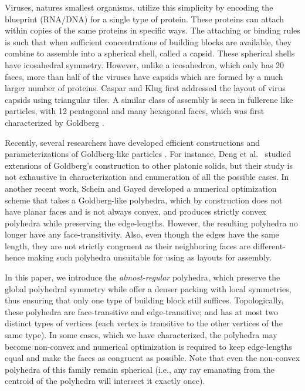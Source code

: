 \documentclass[11pt]{article}
\newcommand{\1}{\mathds{1}}
\begin{document}
Viruses, natures smallest organisms, utilize this simplicity by encoding the blueprint (RNA/DNA) for a single type of protein. These proteins can attach within copies of the same proteins in specific ways. The attaching or binding rules is such that when sufficient concentrations of building blocks are available, they combine to assemble into a spherical shell, called a capsid. These spherical shells have icosahedral symmetry. However, unlike a icosahedron, which only has 20 faces, more than half of the viruses have capsids which are formed by a much larger number of proteins. Caspar and Klug \cite{caspar62} first addressed the layout of virus capsids using triangular tiles. A similar class of assembly is seen in fullerene like particles, with 12 pentagonal and many hexagonal faces, which was first characterized by Goldberg \cite{Goldberg_1937}. 

Recently, several researchers have developed efficient constructions and parameterizations of Goldberg-like particles \cite{Hu_Qiu_2008,Schwerdtfeger_Wirz_Avery_2013,Fowler_Rogers_2001}. For instance, Deng et al.\ \cite{Deng_Yu_2012} studied extensions of Goldberg's construction to other platonic solids, but their study is not exhaustive in characterization and enumeration of all the possible cases. In another recent work, Schein and Gayed \cite{Schein_Gayed_2014} developed a numerical optimization scheme that takes a Goldberg-like polyhedra, which by construction does not have planar faces and is not always convex, and produces strictly convex polyhedra while preserving the edge-lengths. However, the resulting polyhedra no longer have any face-transitivity. Also, even though the edges have the same length, they are not strictly congruent as their neighboring faces are different- hence making such polyhedra unsuitable for using as layouts for assembly. 

In this paper, we introduce the \emph{almost-regular} polyhedra, which preserve the global polyhedral symmetry while offer a denser packing with local symmetries, thus ensuring that only one type of building block still suffices. Topologically, these polyhedra are face-transitive and edge-transitive; and has at most two distinct types of vertices (each vertex is transitive to the other vertices of the same type). In some cases, which we have characterized, the polyhedra may become non-convex and numerical optimization is required to keep edge-lengths equal and make the faces as congruent as possible. Note that even the non-convex polyhedra of this family remain spherical (i.e., any ray emanating from the centroid of the polyhedra will intersect it exactly once).
\end{document}
